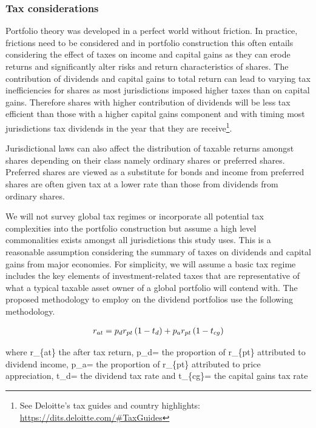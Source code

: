 \documentclass[12pt,preprint, authoryear]{elsarticle}
\numberwithin{equation}{section}
\numberwithin{figure}{section}
\numberwithin{table}{section}
\let\rmarkdownfootnote\footnote%
\def\footnote{\protect\rmarkdownfootnote}
\begin{document}
\newpage

\hypertarget{tax-considerations}{%
\subsubsection{Tax considerations}\label{tax-considerations}}

Portfolio theory was developed in a perfect world without friction. In
practice, frictions need to be considered and in portfolio construction
this often entails considering the effect of taxes on income and capital
gains as they can erode returns and significantly alter risks and return
characteristics of shares. The contribution of dividends and capital
gains to total return can lead to varying tax inefficiencies for shares
as most jurisdictions imposed higher taxes than on capital gains.
Therefore shares with higher contribution of dividends will be less tax
efficient than those with a higher capital gains component and with
timing most jurisdictions tax dividends in the year that they are
receive\footnote{See Deloitte's tax guides and country highlights:
  \url{https://dits.deloitte.com/\#TaxGuides}}.

Jurisdictional laws can also affect the distribution of taxable returns
amongst shares depending on their class namely ordinary shares or
preferred shares. Preferred shares are viewed as a substitute for bonds
and income from preferred shares are often given tax at a lower rate
than those from dividends from ordinary shares.

We will not survey global tax regimes or incorporate all potential tax
complexities into the portfolio construction but assume a high level
commonalities exists amongst all jurisdictions this study uses. This is
a reasonable assumption considering the summary of taxes on dividends
and capital gains from major economies. For simplicity, we will assume a
basic tax regime includes the key elements of investment-related taxes
that are representative of what a typical taxable asset owner of a
global portfolio will contend with. The proposed methodology to employ
on the dividend portfolios use the following methodology.

\begin{align}
r_{a t}=p_d r_{p t}\left(1-t_d\right)+p_a r_{p t}\left(1-t_{c g}\right) \notag
\end{align}

where r\_\{at\} the after tax return, p\_d= the proportion of r\_\{pt\}
attributed to dividend income, p\_a= the proportion of r\_\{pt\}
attributed to price appreciation, t\_d= the dividend tax rate and
t\_\{cg\}= the capital gains tax rate
\end{document}
